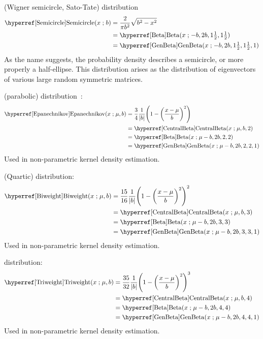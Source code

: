  (Wigner semicircle, Sato-Tate) distribution~\cite{Wigner1955}
\begin{align}
\label{Semicircle}
\opr{Semicircle}(x\given b) &= \frac{2}{\pi b^2} \sqrt{b^2-x^2} \checked \\
& =\opr{Beta}(x\given -b, 2b, 1\tfrac{1}{2}, 1\tfrac{1}{2}) \notag \checked \\
& =\opr{GenBeta}(x\given -b, 2b, 1\tfrac{1}{2}, 1\tfrac{1}{2},1) \notag \checked
\end{align}
As the name suggests, the probability density describes a semicircle, or more properly a half-ellipse. This distribution arises as the distribution of eigenvectors of various large random symmetric matrices. 

 (parabolic) distribution~\cite{Epanechnikov1969a}:
\begin{align}
\label{Epanechnikov}
\opr{Epanechnikov}(x\given \mu, b) 
&= \frac{3}{4} \frac{1}{|b|} \Left(1-\Left(\frac{x-\mu}{b}\Right)^2 \Right) \checked
 \\
& = \opr{CentralBeta}(x\given \mu, b, 2) \notag \checked \\
& = \opr{Beta}(x\given \mu-b, 2 b, 2, 2) \notag   \checked \\
& = \opr{GenBeta}(x\given \mu-b, 2b, 2, 2,1) \checked \notag 
\end{align}
Used in non-parametric kernel density estimation.


 (Quartic) distribution:
\begin{align}
\label{Biweight}
\opr{Biweight}(x\given \mu, b) 
&= \frac{15}{16} \frac{1}{|b|} \Left(1-\Left(\frac{x-\mu}{b}\Right)^2 \Right)^2 
\checked
 \\
& = \opr{CentralBeta}(x\given \mu, b, 3) \notag  \checked\\
& = \opr{Beta}(x\given \mu-b, 2 b, 3, 3) \notag   \checked \\
& = \opr{GenBeta}(x\given \mu-b, 2b, 3, 3,1)  \notag \checked
\end{align}
Used in non-parametric kernel density estimation.

 distribution:
\begin{align}
\label{Triweight}
\opr{Triweight}(x\given \mu, b) 
&= \frac{35}{32} \frac{1}{|b|} \Left(1-\Left(\frac{x-\mu}{b}\Right)^2 \Right)^3 
\checked
 \\
& = \opr{CentralBeta}(x\given \mu, b, 4) \notag  \checked\\
& = \opr{Beta}(x\given \mu-b, 2 b, 4, 4) \notag   \checked \\
& = \opr{GenBeta}(x\given \mu-b, 2b, 4, 4,1)  \notag \checked
\end{align}
Used in non-parametric kernel density estimation.



